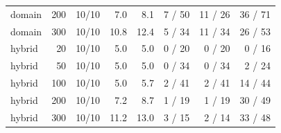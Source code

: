 \begin{table}[t]
\begin{tabular}{@{}lrrrrrrr@{}}
domain & 200 & 10/10 & 7.0 & 8.1 & 7 / 50 & 11 / 26 & 36 / 71 \\
domain & 300 & 10/10 & 10.8 & 12.4 & 5 / 34 & 11 / 34 & 26 / 53 \\
hybrid & 20 & 10/10 & 5.0 & 5.0 & 0 / 20 & 0 / 20 & 0 / 16 \\
hybrid & 50 & 10/10 & 5.0 & 5.0 & 0 / 34 & 0 / 34 & 2 / 24 \\
hybrid & 100 & 10/10 & 5.0 & 5.7 & 2 / 41 & 2 / 41 & 14 / 44 \\
hybrid & 200 & 10/10 & 7.2 & 8.7 & 1 / 19 & 1 / 19 & 30 / 49 \\
hybrid & 300 & 10/10 & 11.2 & 13.0 & 3 / 15 & 2 / 14 & 33 / 48 \\
\bottomrule
\end{tabular}
\end{table}
